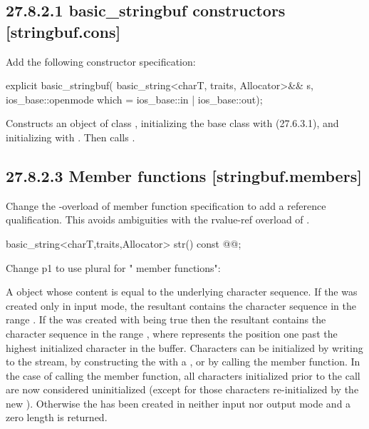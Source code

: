 \documentclass[ebook,11pt,article]{memoir}
\begin{document}
\subsection{27.8.2.1 basic\_stringbuf constructors [stringbuf.cons]}
Add the following constructor specification:
\begin{insrt}
\begin{itemdecl}
      explicit basic_stringbuf(
        basic_string<charT, traits, Allocator>&& s,
        ios_base::openmode which = ios_base::in | ios_base::out);
\end{itemdecl}
\begin{itemdescr}
\pnum
\effects Constructs an object of class , initializing the base class with  (27.6.3.1), and initializing  with . Then calls .
\end{itemdescr}
\end{insrt}

\subsection{27.8.2.3 Member functions [stringbuf.members]}
Change the -overload of  member function specification to add a reference qualification. This avoids ambiguities with the rvalue-ref overload of .  
\begin{codeblock}
basic_string<charT,traits,Allocator> str() const @\ins{\&}@;
\end{codeblock}

Change p1 to use plural for " member functions":

\begin{itemdescr}
\pnum
\returns
A
object whose content is equal to the
underlying character sequence.
If the  was created only in input mode, the resultant
 contains the character sequence in the range
. If the  was created with
 being true then the resultant 
contains the character sequence in the range , where
 represents the position one past the highest initialized character
in the buffer. Characters can be initialized by writing to the stream, by constructing
the  with a , or by calling 
the
 member function. In the case of calling 
the
 member function, all characters initialized prior to
the call are now considered uninitialized (except for those characters re-initialized
by the new ). Otherwise the  has been created
in neither input nor output mode and a zero length  is returned. 
\end{itemdescr}
\end{document}
